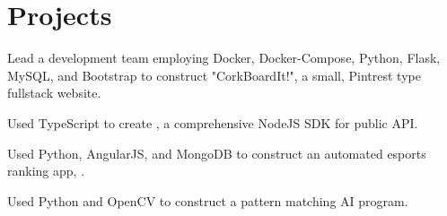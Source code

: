 \documentclass[]{deedy-resume-openfont}
\begin{document}
\begin{minipage}[t]{0.66\textwidth}
\section{Projects}
\begin{tightemize} 
\item Lead a development team employing Docker, Docker-Compose, Python, Flask, MySQL, and Bootstrap to construct "CorkBoardIt!", a small, Pintrest type fullstack website. 
\item Used TypeScript to create  \href{http://npmjs.com/package/smashgg.js}{}, a comprehensive NodeJS SDK for \href{www.smash.gg}{} public API.
\item Used Python, AngularJS, and MongoDB to construct an automated esports ranking app, \href{https://notgarpr.com}{}.
\item Used Python and OpenCV to construct a pattern matching AI program.
\end{tightemize}
\sectionsep





\end{minipage} 
\end{document}
